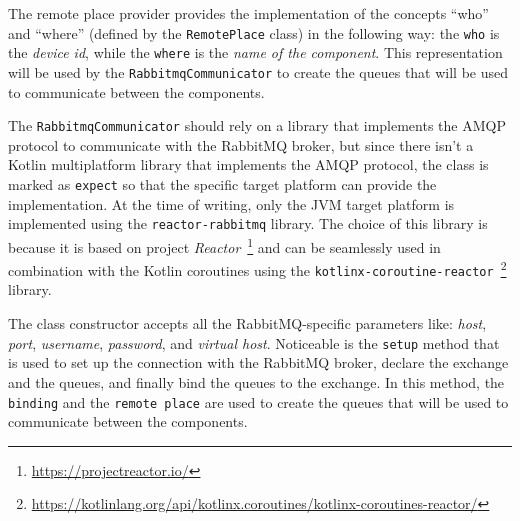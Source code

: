 The remote place provider provides the implementation of the concepts ``who'' and ``where'' (defined by the \texttt{RemotePlace} class) in the
following way: the \texttt{who} is the \emph{device id}, while the \texttt{where} is the \emph{name of the component}.
This representation will be used by the \texttt{RabbitmqCommunicator} to create the queues that will be used to communicate between the components.

The \texttt{RabbitmqCommunicator} should rely on a library that implements the AMQP protocol to communicate with the RabbitMQ broker, but since
there isn't a Kotlin multiplatform library that implements the AMQP protocol, the class is marked as \texttt{expect} so that the specific target
platform can provide the implementation. At the time of writing, only the JVM target platform is implemented using the \texttt{reactor-rabbitmq}
library. The choice of this library is because it is based on project \emph{Reactor}~\footnote{\url{https://projectreactor.io/}} and can be
seamlessly used in combination with the Kotlin coroutines using the
\texttt{kotlinx-coroutine-reactor}~\footnote{\url{https://kotlinlang.org/api/kotlinx.coroutines/kotlinx-coroutines-reactor/}} library.

The class constructor accepts all the RabbitMQ-specific parameters like: \emph{host}, \emph{port}, \emph{username}, \emph{password}, and
\emph{virtual host}.
Noticeable is the \texttt{setup} method that is used to set up the connection with the RabbitMQ broker, declare the exchange and the queues, and
finally bind the queues to the exchange. In this method, the \texttt{binding} and the \texttt{remote place} are used to create the queues that will
be used to communicate between the components.

